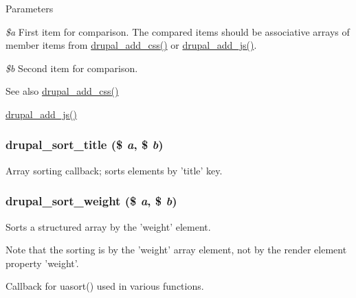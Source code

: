\begin{DoxyParams}{Parameters}
\item[{\em \$a}]First item for comparison. The compared items should be associative arrays of member items from \hyperlink{common_8inc_a2c5bb2667efb44b02f1a105c0bfdebe5}{drupal\_\-add\_\-css()} or \hyperlink{common_8inc_a623370a2c3c2de0390dab078d17dca02}{drupal\_\-add\_\-js()}. \item[{\em \$b}]Second item for comparison.\end{DoxyParams}
\begin{DoxySeeAlso}{See also}
\hyperlink{common_8inc_a2c5bb2667efb44b02f1a105c0bfdebe5}{drupal\_\-add\_\-css()} 

\hyperlink{common_8inc_a623370a2c3c2de0390dab078d17dca02}{drupal\_\-add\_\-js()} 
\end{DoxySeeAlso}
\hypertarget{common_8inc_a3978e07c67adb7db3b9728c54d1ef67b}{
\subsubsection[{drupal\_\-sort\_\-title}]{\setlength{\rightskip}{0pt plus 5cm}drupal\_\-sort\_\-title (\$ {\em a}, \/  \$ {\em b})}}
\label{common_8inc_a3978e07c67adb7db3b9728c54d1ef67b}
Array sorting callback; sorts elements by 'title' key. \hypertarget{common_8inc_ab998a16150fa137f79c86d197e809fb8}{
\subsubsection[{drupal\_\-sort\_\-weight}]{\setlength{\rightskip}{0pt plus 5cm}drupal\_\-sort\_\-weight (\$ {\em a}, \/  \$ {\em b})}}
\label{common_8inc_ab998a16150fa137f79c86d197e809fb8}
Sorts a structured array by the 'weight' element.

Note that the sorting is by the 'weight' array element, not by the render element property 'weight'.

Callback for uasort() used in various functions.


